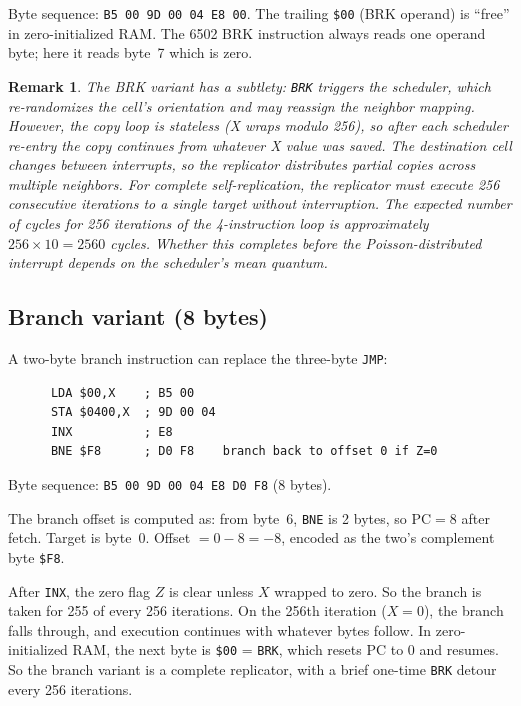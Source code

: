 \documentclass{article}
\newcommand{\hex}[1]{\texttt{\$#1}}
\newcommand{\opcode}[1]{\texttt{#1}}
\newtheorem{remark}{Remark}
\begin{document}
Byte sequence: \texttt{B5 00 9D 00 04 E8 00}.
The trailing \hex{00} (BRK operand) is ``free'' in zero-initialized RAM.
The 6502 BRK instruction always reads one operand byte; here it reads
byte~7 which is zero.

\begin{remark}
The BRK variant has a subtlety: \opcode{BRK} triggers the scheduler,
which re-randomizes the cell's orientation and may reassign the neighbor
mapping. However, the copy loop is stateless (X wraps modulo 256), so
after each scheduler re-entry the copy continues from whatever X value
was saved.  The destination cell changes between interrupts, so the
replicator distributes partial copies across multiple neighbors. For
complete self-replication, the replicator must execute 256 consecutive
iterations to a single target without interruption.
The expected number of cycles for 256 iterations of the 4-instruction
loop is approximately $256 \times 10 = 2560$ cycles. Whether this
completes before the Poisson-distributed interrupt depends on the
scheduler's mean quantum.
\end{remark}

\subsection{Branch variant (8 bytes)}

A two-byte branch instruction can replace the three-byte \opcode{JMP}:

\begin{lstlisting}
      LDA $00,X    ; B5 00
      STA $0400,X  ; 9D 00 04
      INX          ; E8
      BNE $F8      ; D0 F8    branch back to offset 0 if Z=0
\end{lstlisting}

Byte sequence: \texttt{B5 00 9D 00 04 E8 D0 F8} (8 bytes).

The branch offset is computed as: from byte~6, \opcode{BNE} is 2 bytes,
so $\mathrm{PC} = 8$ after fetch. Target is byte~0.
Offset $= 0 - 8 = -8$, encoded as the two's complement byte \hex{F8}.

After \opcode{INX}, the zero flag $Z$ is clear unless $X$ wrapped to
zero. So the branch is taken for 255 of every 256 iterations. On the
256th iteration ($X = 0$), the branch falls through, and execution
continues with whatever bytes follow. In zero-initialized RAM, the
next byte is \hex{00} = \opcode{BRK}, which resets PC to 0 and
resumes. So the branch variant is a complete replicator, with a brief
one-time \opcode{BRK} detour every 256 iterations.
\end{document}
